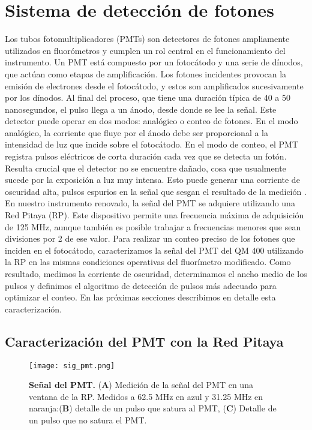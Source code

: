 \section{Sistema de detección de fotones}


 
Los tubos fotomultiplicadores (PMTs) son detectores de fotones ampliamente utilizados en fluorómetros y cumplen un rol central en el funcionamiento del instrumento. 
Un PMT está compuesto por un fotocátodo y una serie de dínodos, que actúan como etapas de amplificación. 
Los fotones incidentes provocan la emisión de electrones desde el fotocátodo, y estos son amplificados sucesivamente por los dínodos. 
Al final del proceso, que tiene una duración típica de 40 a 50 nanosegundos, el pulso llega a un ánodo, desde donde se lee la señal. 
Este detector puede operar en dos modos: analógico o conteo de fotones. 
En el modo analógico, la corriente que fluye por el ánodo debe ser proporcional a la intensidad de luz que incide sobre el fotocátodo.
En el modo de conteo, el PMT registra pulsos eléctricos de corta duración cada vez que se detecta un fotón. 
Resulta crucial que el detector no se encuentre dañado, cosa que usualmente sucede por la exposición a luz muy intensa. 
Esto puede generar una corriente de oscuridad alta, pulsos espurios en la señal que sesgan el resultado de la medición \cite{lakowicz_principles_2006}.
En nuestro instrumento renovado, la señal del PMT se adquiere utilizando una Red Pitaya (RP). 
Este dispositivo permite una frecuencia máxima de adquisición de 125 MHz, aunque también es posible trabajar a frecuencias menores que sean divisiones por 2 de ese valor. 
Para realizar un conteo preciso de los fotones que inciden en el fotocátodo, caracterizamos la señal del PMT del QM 400 utilizando la RP en las mismas condiciones operativas del fluorímetro modificado.
Como resultado, medimos la corriente de oscuridad, determinamos el ancho medio de los pulsos y definimos el algoritmo de detección de pulsos más adecuado para optimizar el conteo. 
En las próximas secciones describimos en detalle esta caracterización.



\subsection{Caracterización del PMT con la Red Pitaya} \label{sec:caracterizacion_pmt}

\begin{figure}
    \centering
    \texttt{[image: sig\_pmt.png]}
    \caption{\textbf{Señal del PMT.} (\textbf{A}) Medición de la señal del PMT en una ventana de la RP. Medidos a 62.5 MHz en azul y 31.25 MHz en naranja:(\textbf{B}) detalle de un pulso que satura al PMT, (\textbf{C}) Detalle de un pulso que no satura el PMT.}
    \label{fig:pmt_signal}
\end{figure}

